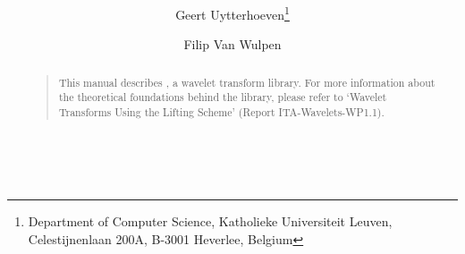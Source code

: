 %
%
% 
% 
% 
% 
%

\title{\resizebox{30mm}{!}{\liblogo} \raisebox{16mm}{\textsf{\libtitle}}}
\author{Geert Uytterhoeven\thanks{Department of Computer Science, Katholieke
Universiteit Leuven, Celestijnenlaan 200A, B-3001 Heverlee, Belgium} \and Filip
Van Wulpen\addtocounter{footnote}{-1}\footnotemark}

\maketitle

\begin{center}
\libemail \\ \libwww
\end{center}

\vfill

\begin{abstract} \begin{quotation}
This manual describes \emph{\libname}, a wavelet transform library.
For more information about the theoretical foundations behind the library,
please refer to `Wavelet Transforms Using the Lifting Scheme' (Report
ITA-Wavelets-WP1.1).
\end{quotation} \end{abstract}

\vfill

\begin{acknowledgements} \begin{quotation}
\sloppy
\itaacknowledgement
\end{quotation} \end{acknowledgements}

\vfill

